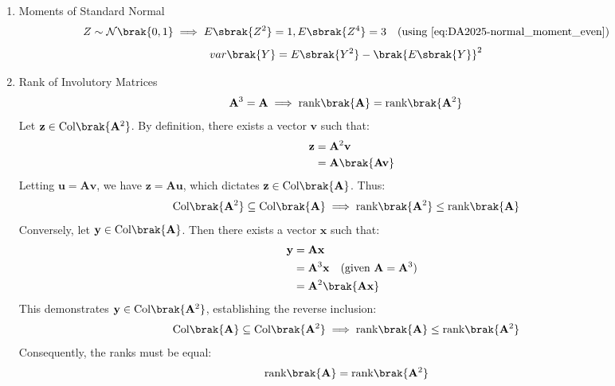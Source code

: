 \begin{enumerate}[label=\thesubsection.\arabic*, ref=\thesubsection.\theenumi]
\item Moments of Standard Normal
\begin{align}
	Z &\sim \mathcal{N}\brak{0, 1} \implies E\sbrak{Z^2} = 1, E\sbrak{Z^4} = 3 \quad \text{(using \eqref{eq:DA2025-normal_moment_even})} \label{eq:DA2025-normal_moments_2_4}
\end{align}
\begin{align}
	var\brak{Y} &= E\sbrak{Y^2} - \brak{E\sbrak{Y}}^2  \label{eq:DA2025-varY}
\end{align}
	\item Rank of Involutory Matrices
	\begin{align}
		\mathbf{A}^3 &= \mathbf{A} \implies \text{rank}\brak{\mathbf{A}} = \text{rank}\brak{\mathbf{A}^2} \label{eq:1.1.26.1}
	\end{align}
	\solution
	Let $\mathbf{z} \in \text{Col}\brak{\mathbf{A}^2}$. By definition, there exists a vector $\mathbf{v}$ such that:
	\begin{align}
		\mathbf{z} &= \mathbf{A}^2\mathbf{v}
		\\
		&= \mathbf{A}\brak{\mathbf{A}\mathbf{v}}
	\end{align}
	Letting $\mathbf{u} = \mathbf{A}\mathbf{v}$, we have $\mathbf{z} = \mathbf{A}\mathbf{u}$, which dictates $\mathbf{z} \in \text{Col}\brak{\mathbf{A}}$. Thus:
	\begin{align}
		\text{Col}\brak{\mathbf{A}^2} &\subseteq \text{Col}\brak{\mathbf{A}} \implies \text{rank}\brak{\mathbf{A}^2} \leq \text{rank}\brak{\mathbf{A}}
	\end{align}
	Conversely, let $\mathbf{y} \in \text{Col}\brak{\mathbf{A}}$. Then there exists a vector $\mathbf{x}$ such that:
	\begin{align}
		\mathbf{y} &= \mathbf{A}\mathbf{x}
		\\
		&= \mathbf{A}^3\mathbf{x} \quad \text{(given $\mathbf{A} = \mathbf{A}^3$)}
		\\
		&= \mathbf{A}^2 \brak{\mathbf{A}\mathbf{x}}
	\end{align}
	This demonstrates $\mathbf{y} \in \text{Col}\brak{\mathbf{A}^2}$, establishing the reverse inclusion:
	\begin{align}
		\text{Col}\brak{\mathbf{A}} &\subseteq \text{Col}\brak{\mathbf{A}^2} \implies \text{rank}\brak{\mathbf{A}} \leq \text{rank}\brak{\mathbf{A}^2}
	\end{align}
	Consequently, the ranks must be equal:
	\begin{align}
		\text{rank}\brak{\mathbf{A}} &= \text{rank}\brak{\mathbf{A}^2}
	\end{align}
	

\end{enumerate}
